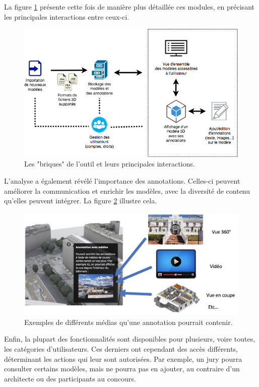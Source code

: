 La figure \ref{fig:mip-viewer-components-interactions-diagram} présente cette fois de manière plus détaillée ces modules, en précisant les principales interactions entre ceux-ci.

\begin{figure}
    \centering
    \includegraphics[width=0.9\linewidth]{Figures/mip-viewer-components-interactions-diagram.png}
    \caption{Les "briques" de l'outil et leurs principales interactions.}
    \label{fig:mip-viewer-components-interactions-diagram}
\end{figure}

L'analyse a également révélé l'importance des annotations. Celles-ci peuvent améliorer la communication et enrichir les modèles, avec la diversité de contenu qu'elles peuvent intégrer. La figure \ref{fig:various-media-for-annotation} illustre cela.

\begin{figure}
    \centering
    \includegraphics[width=\linewidth]{Figures/various-media-for-annotation.png}
    \caption{Exemples de différents médias qu'une annotation pourrait contenir.}
    \label{fig:various-media-for-annotation}
\end{figure}

Enfin, la plupart des fonctionnalités sont disponibles pour plusieurs, voire toutes, les catégories d'utilisateurs. Ces derniers ont cependant des accès différents, déterminant les actions qui leur sont autorisées. Par exemple, un jury pourra consulter certains modèles, mais ne pourra pas en ajouter, au contraire d'un architecte ou des participants au concours.

